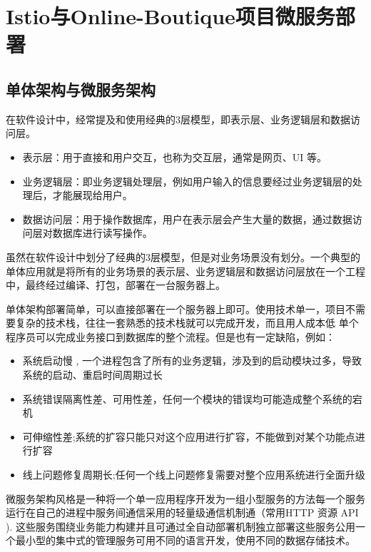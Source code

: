 \section{Istio与Online-Boutique项目微服务部署}
\subsection{单体架构与微服务架构}
在软件设计中，经常提及和使用经典的3层模型，即表示层、业务逻辑层和数据访问层。
\begin{itemize}
	\item 表示层：用于直接和用户交互，也称为交互层，通常是网页、UI 等。
	
	\item 业务逻辑层：即业务逻辑处理层，例如用户输入的信息要经过业务逻辑层的处理后，才能展现给用户。
	
	\item 数据访问层：用于操作数据库，用户在表示层会产生大量的数据，通过数据访问层对数据库进行读写操作。
\end{itemize}

虽然在软件设计中划分了经典的3层模型，但是对业务场景没有划分。一个典型的单体应用就是将所有的业务场景的表示层、业务逻辑层和数据访问层放在一个工程中，最终经过编译、打包，部署在一台服务器上。

单体架构部署简单，可以直接部署在一个服务器上即可。使用技术单一，项目不需要复杂的技术栈，往往一套熟悉的技术栈就可以完成开发，而且用人成本低 单个程序员可以完成业务接口到数据库的整个流程。但是也有一定缺陷，例如：
\begin{itemize}
	\item 系统启动慢 , 一个进程包含了所有的业务逻辑，涉及到的启动模块过多，导致系统的启动、重启时间周期过长
	
	\item 系统错误隔离性差、可用性差，任何一个模块的错误均可能造成整个系统的宕机
	
	\item 可伸缩性差;系统的扩容只能只对这个应用进行扩容，不能做到对某个功能点进行扩容
	
	\item 线上问题修复周期长;任何一个线上问题修复需要对整个应用系统进行全面升级
\end{itemize}

微服务架构风格\cite{weifuwujiagou}是一种将一个单一应用程序开发为一组小型服务的方法每一个服务运行在自己的进程中服务间通信采用的轻量级通信机制通（常用HTTP 资源 API ). 这些服务围绕业务能力构建并且可通过全自动部署机制独立部署这些服务公用一个最小型的集中式的管理服务可用不同的语言开发，使用不同的数据存储技术。

